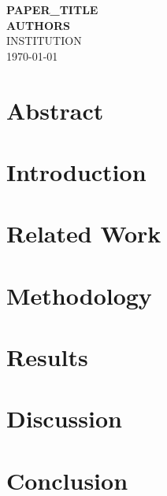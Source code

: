 \documentclass[a4paper]{article}
\begin{document}
\begin{titlepage}
    \centering
    \vspace*{\fill}
    {\LARGE \bfseries {{PAPER_TITLE}}} \\
    \vspace{2cm}
    {\large \bfseries {{AUTHORS}}} \\
    \vspace{2cm}
    {\large {{INSTITUTION}}} \\
    \vspace{1cm}
    {\large \today}
    \vspace*{\fill}
\end{titlepage}

\newpage
\section*{Abstract}

\newpage
\tableofcontents

\newpage
\listoffigures

\newpage
\listoftables

\newpage
\section{Introduction}
\label{sec:introduction}


\newpage
\section{Related Work}
\label{sec:related-work}

\newpage
\section{Methodology}
\label{sec:methodology}

\newpage
\section{Results}
\label{sec:results}

\newpage
\section{Discussion}
\label{sec:discussion}

\newpage
\section{Conclusion}
\label{sec:conclusion}

\printbibliography
\end{document}
